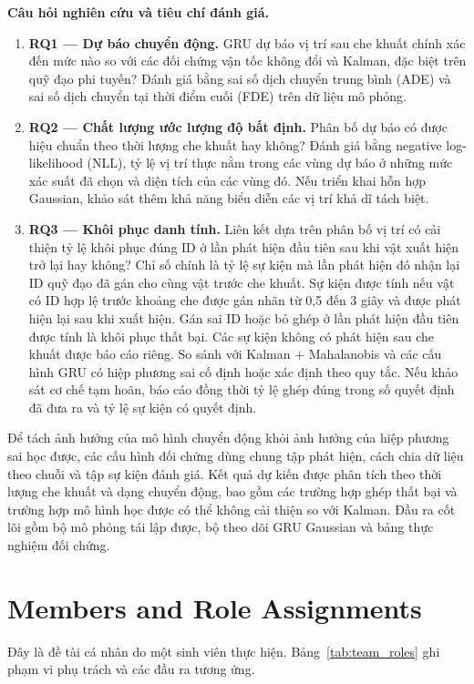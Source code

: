 \textbf{Câu hỏi nghiên cứu và tiêu chí đánh giá.}
\begin{enumerate}
    \item \textbf{RQ1 — Dự báo chuyển động.} GRU dự báo vị trí sau che khuất chính xác đến mức nào so với các đối chứng vận tốc không đổi và Kalman, đặc biệt trên quỹ đạo phi tuyến? Đánh giá bằng sai số dịch chuyển trung bình (ADE) và sai số dịch chuyển tại thời điểm cuối (FDE) trên dữ liệu mô phỏng.
    \item \textbf{RQ2 — Chất lượng ước lượng độ bất định.} Phân bố dự báo có được hiệu chuẩn theo thời lượng che khuất hay không? Đánh giá bằng negative log-likelihood (NLL), tỷ lệ vị trí thực nằm trong các vùng dự báo ở những mức xác suất đã chọn và diện tích của các vùng đó. Nếu triển khai hỗn hợp Gaussian, khảo sát thêm khả năng biểu diễn các vị trí khả dĩ tách biệt.
    \item \textbf{RQ3 — Khôi phục danh tính.} Liên kết dựa trên phân bố vị trí có cải thiện tỷ lệ khôi phục đúng ID ở lần phát hiện đầu tiên sau khi vật xuất hiện trở lại hay không? Chỉ số chính là tỷ lệ sự kiện mà lần phát hiện đó nhận lại ID quỹ đạo đã gán cho cùng vật trước che khuất. Sự kiện được tính nếu vật có ID hợp lệ trước khoảng che được gán nhãn từ 0,5 đến 3 giây và được phát hiện lại sau khi xuất hiện. Gán sai ID hoặc bỏ ghép ở lần phát hiện đầu tiên được tính là khôi phục thất bại. Các sự kiện không có phát hiện sau che khuất được báo cáo riêng. So sánh với Kalman + Mahalanobis và các cấu hình GRU có hiệp phương sai cố định hoặc xác định theo quy tắc. Nếu khảo sát cơ chế tạm hoãn, báo cáo đồng thời tỷ lệ ghép đúng trong số quyết định đã đưa ra và tỷ lệ sự kiện có quyết định.
\end{enumerate}

Để tách ảnh hưởng của mô hình chuyển động khỏi ảnh hưởng của hiệp phương sai học được, các cấu hình đối chứng dùng chung tập phát hiện, cách chia dữ liệu theo chuỗi và tập sự kiện đánh giá. Kết quả dự kiến được phân tích theo thời lượng che khuất và dạng chuyển động, bao gồm các trường hợp ghép thất bại và trường hợp mô hình học được có thể không cải thiện so với Kalman. Đầu ra cốt lõi gồm bộ mô phỏng tái lập được, bộ theo dõi GRU Gaussian và bảng thực nghiệm đối chứng.

\section{Members and Role Assignments}
\label{sec:members_roles}

Đây là đề tài cá nhân do một sinh viên thực hiện. Bảng~\ref{tab:team_roles} ghi phạm vi phụ trách và các đầu ra tương ứng.

